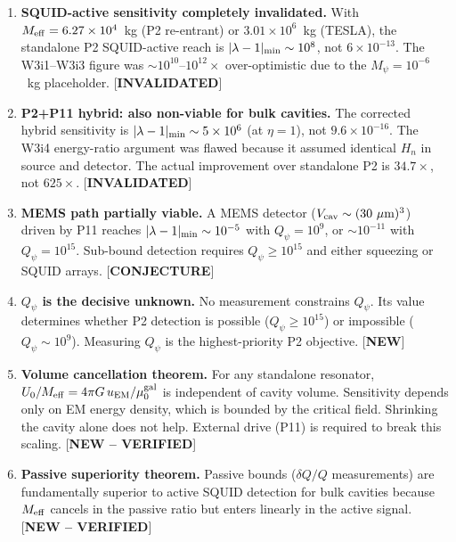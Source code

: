 \documentclass[11pt,twocolumn]{article}
\newcommand{\lam}{\lambda}
\newcommand{\Mpsi}{M_\psi}
\newcommand{\Meff}{M_{\rm eff}}
\newcommand{\ee}[1]{\times 10^{#1}}
\newcommand{\Qpsi}{Q_\psi}
\newcommand{\Heff}{H_n}
\newcommand{\Vcav}{V_{\rm cav}}
\newcommand{\muG}{\mu_0^{\rm gal}}
\theoremstyle{definition}
\theoremstyle{remark}
\begin{document}
\begin{enumerate}

\item \textbf{SQUID-active sensitivity completely invalidated.}
  With $\Meff = 6.27\ee{4}$~kg (P2 re-entrant) or $3.01\ee{6}$~kg (TESLA),
  the standalone P2 SQUID-active reach is $|\lam-1|_{\rm min} \sim 10^8$,
  not $6\ee{-13}$. The W3i1--W3i3 figure was $\sim 10^{10}$--$10^{12}\times$
  over-optimistic due to the $\Mpsi = 10^{-6}$~kg placeholder.
  [\textbf{INVALIDATED}]

\item \textbf{P2+P11 hybrid: also non-viable for bulk cavities.}
  The corrected hybrid sensitivity is $|\lam-1|_{\rm min} \sim 5\ee{6}$
  (at $\eta = 1$), not $9.6\ee{-16}$. The W3i4 energy-ratio argument was
  flawed because it assumed identical $\Heff$ in source and detector.
  The actual improvement over standalone P2 is $34.7\times$, not $625\times$.
  [\textbf{INVALIDATED}]

\item \textbf{MEMS path partially viable.}
  A MEMS detector ($\Vcav \sim (30~\mu\text{m})^3$) driven by P11 reaches
  $|\lam-1|_{\rm min} \sim 10^{-5}$ with $\Qpsi = 10^9$, or
  $\sim 10^{-11}$ with $\Qpsi = 10^{15}$. Sub-bound detection requires
  $\Qpsi \geq 10^{15}$ and either squeezing or SQUID arrays.
  [\textbf{CONJECTURE}]

\item \textbf{$\Qpsi$ is the decisive unknown.}
  No measurement constrains $\Qpsi$. Its value determines whether P2
  detection is possible ($\Qpsi \geq 10^{15}$) or impossible
  ($\Qpsi \sim 10^9$). Measuring $\Qpsi$ is the highest-priority
  P2 objective. [\textbf{NEW}]

\item \textbf{Volume cancellation theorem.}
  For any standalone resonator, $U_0/\Meff = 4\pi G\,u_{\rm EM}/\muG$
  is independent of cavity volume. Sensitivity depends only on EM energy
  density, which is bounded by the critical field. Shrinking the cavity
  alone does not help. External drive (P11) is required to break this
  scaling. [\textbf{NEW -- VERIFIED}]

\item \textbf{Passive superiority theorem.}
  Passive bounds ($\delta Q/Q$ measurements) are fundamentally superior
  to active SQUID detection for bulk cavities because $\Meff$ cancels
  in the passive ratio but enters linearly in the active signal.
  [\textbf{NEW -- VERIFIED}]


\end{enumerate}
\end{document}
